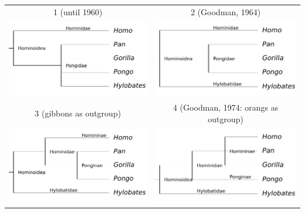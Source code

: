\begin{samepage}
\begin{tabular}{cc}
1 (until 1960) & 2 (Goodman, 1964) \\
\includegraphics[scale=0.7]{homino_0.pdf} & \includegraphics[scale=0.7]{homino_1.pdf} \\
3 (gibbons as outgroup) & 4 (Goodman, 1974: orangs as outgroup) \\
\includegraphics[scale=0.7]{homino_2.pdf} & \includegraphics[scale=0.7]{homino_3.pdf} \\

\end{tabular}
\end{samepage}

